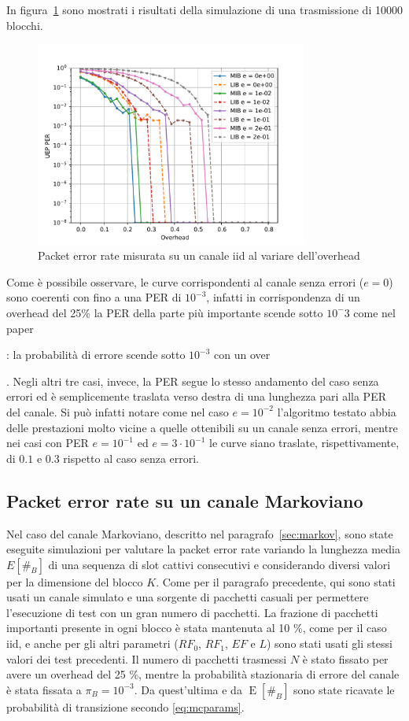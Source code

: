 \documentclass[italian, a4paper, 12pt]{article}
\newcommand{\E}[1]{\operatorname{E}\left[#1\right]}
\newcommand{\EnB}{\E{\#_B}}
\begin{document}
In figura~\ref{fig:iid} sono mostrati i risultati della simulazione di
una trasmissione di 10000 blocchi.
%
\begin{figure}[H]
    \centering
        \includegraphics[clip, trim=0cm 0cm 0cm 0cm, width=0.80\textwidth]{plot_ber_iid.pdf}
    \caption{Packet error rate misurata su un canale iid al variare
    dell'overhead}
    \label{fig:iid}
\end{figure}
%
Come è possibile osservare, le curve corrispondenti al canale senza
errori ($e=0$) sono coerenti con \cite{uep} fino a una PER di
$10^{-3}$, infatti in corrispondenza di un overhead del 25\% la PER
della parte più importante scende sotto $10^-3$ come nel paper

: la probabilità di errore
scende sotto $10^{-3}$ con un over

. Negli altri tre casi, invece, la PER segue lo
stesso andamento del caso senza errori ed è semplicemente traslata
verso destra di una lunghezza pari alla PER del canale.
%
Si può infatti notare come nel caso $e = 10^{-2}$ l'algoritmo testato
abbia delle prestazioni molto vicine a quelle ottenibili su un canale
senza errori, mentre nei casi con PER $e = 10^{-1}$ ed $e = 3\cdot
10^{-1}$ le curve siano traslate, rispettivamente, di $0.1$ e $0.3$
rispetto al caso senza errori.

\subsection{Packet error rate su un canale Markoviano}
Nel caso del canale Markoviano, descritto nel
paragrafo~\ref{sec:markov}, sono state eseguite simulazioni per
valutare la packet error rate variando la lunghezza media $E[\#_B]$
di una sequenza di slot cattivi consecutivi e considerando diversi
valori per la dimensione del blocco $K$.
%
Come per il paragrafo precedente, qui sono stati usati un canale
simulato e una sorgente di pacchetti casuali per permettere
l'esecuzione di test con un gran numero di pacchetti.
%
La frazione di pacchetti importanti presente in ogni blocco è stata
mantenuta al 10 \%, come per il caso iid, e anche per gli altri
parametri ($RF_0$, $RF_1$, $EF$ e $L$) sono stati usati gli stessi
valori dei test precedenti.
%
Il numero di pacchetti trasmessi $N$ è stato fissato per avere un
overhead del 25 \%, mentre la probabilità stazionaria di errore del
canale è stata fissata a $\pi_B = 10^{-3}$. Da quest'ultima e da
$\EnB$ sono state ricavate le probabilità di transizione secondo
\eqref{eq:mcparams}.
\end{document}

